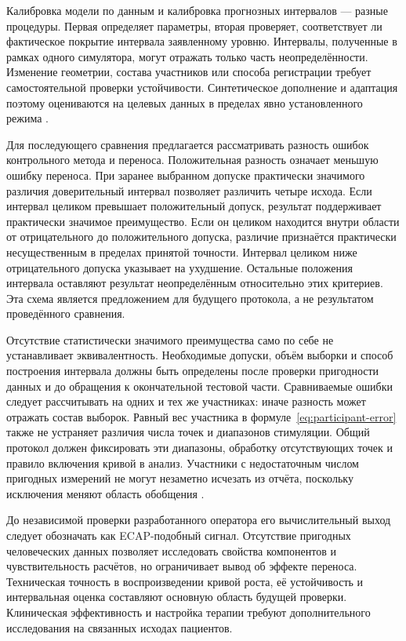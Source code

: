 Калибровка модели по данным и калибровка прогнозных интервалов --- разные процедуры. Первая определяет параметры, вторая проверяет, соответствует ли фактическое покрытие интервала заявленному уровню. Интервалы, полученные в рамках одного симулятора, могут отражать только часть неопределённости. Изменение геометрии, состава участников или способа регистрации требует самостоятельной проверки устойчивости. Синтетическое дополнение и адаптация поэтому оцениваются на целевых данных в пределах явно установленного режима \cite{s285,s836,s149}.

Для последующего сравнения предлагается рассматривать разность ошибок контрольного метода и переноса. Положительная разность означает меньшую ошибку переноса. При заранее выбранном допуске практически значимого различия доверительный интервал позволяет различить четыре исхода. Если интервал целиком превышает положительный допуск, результат поддерживает практически значимое преимущество. Если он целиком находится внутри области от отрицательного до положительного допуска, различие признаётся практически несущественным в пределах принятой точности. Интервал целиком ниже отрицательного допуска указывает на ухудшение. Остальные положения интервала оставляют результат неопределённым относительно этих критериев. Эта схема является предложением для будущего протокола, а не результатом проведённого сравнения.

Отсутствие статистически значимого преимущества само по себе не устанавливает эквивалентность. Необходимые допуски, объём выборки и способ построения интервала должны быть определены после проверки пригодности данных и до обращения к окончательной тестовой части. Сравниваемые ошибки следует рассчитывать на одних и тех же участниках: иначе разность может отражать состав выборок. Равный вес участника в формуле~\eqref{eq:participant-error} также не устраняет различия числа точек и диапазонов стимуляции. Общий протокол должен фиксировать эти диапазоны, обработку отсутствующих точек и правило включения кривой в анализ. Участники с недостаточным числом пригодных измерений не могут незаметно исчезать из отчёта, поскольку исключения меняют область обобщения \cite{posture,s105}.

До независимой проверки разработанного оператора его вычислительный выход следует обозначать как ECAP-подобный сигнал. Отсутствие пригодных человеческих данных позволяет исследовать свойства компонентов и чувствительность расчётов, но ограничивает вывод об эффекте переноса. Техническая точность в воспроизведении кривой роста, её устойчивость и интервальная оценка составляют основную область будущей проверки. Клиническая эффективность и настройка терапии требуют дополнительного исследования на связанных исходах пациентов.

